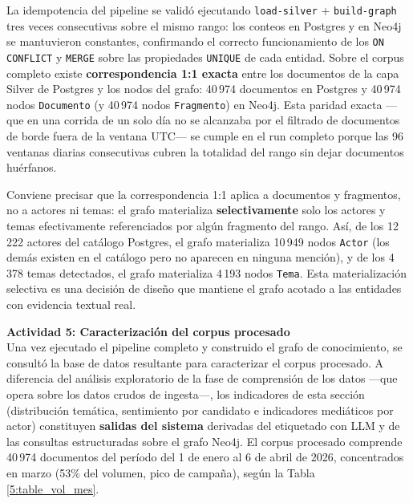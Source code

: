 La idempotencia del pipeline se validó ejecutando \texttt{load-silver} +
\texttt{build-graph} tres veces consecutivas sobre el mismo rango: los conteos
en Postgres y en Neo4j se mantuvieron constantes, confirmando el correcto
funcionamiento de los \texttt{ON CONFLICT} y \texttt{MERGE} sobre las
propiedades \texttt{UNIQUE} de cada entidad. Sobre el corpus completo existe
\textbf{correspondencia 1:1 exacta} entre los documentos de la capa Silver de
Postgres y los nodos del grafo: 40\,974 documentos en Postgres y 40\,974 nodos
\texttt{Documento} (y 40\,974 nodos \texttt{Fragmento}) en Neo4j. Esta paridad
exacta —que en una corrida de un solo día no se alcanzaba por el filtrado de
documentos de borde fuera de la ventana UTC— se cumple en el run completo porque
las 96 ventanas diarias consecutivas cubren la totalidad del rango sin dejar
documentos huérfanos.

Conviene precisar que la correspondencia 1:1 aplica a documentos y fragmentos,
no a actores ni temas: el grafo materializa \textbf{selectivamente} solo los
actores y temas efectivamente referenciados por algún fragmento del rango. Así,
de los 12\,222 actores del catálogo Postgres, el grafo materializa 10\,949 nodos
\texttt{Actor} (los demás existen en el catálogo pero no aparecen en ninguna
mención), y de los 4\,378 temas detectados, el grafo materializa 4\,193 nodos
\texttt{Tema}. Esta materialización selectiva es una decisión de diseño que
mantiene el grafo acotado a las entidades con evidencia textual real.

\textbf{Actividad 5: Caracterización del corpus procesado}
\\
Una vez ejecutado el pipeline completo y construido el grafo de conocimiento,
se consultó la base de datos resultante para caracterizar el corpus
procesado. A diferencia del análisis exploratorio de la fase de comprensión
de los datos —que opera sobre los datos crudos de ingesta—, los indicadores
de esta sección (distribución temática, sentimiento por candidato e
indicadores mediáticos por actor) constituyen \textbf{salidas del sistema}
derivadas del etiquetado con LLM y de las consultas estructuradas sobre el
grafo Neo4j. El corpus procesado comprende 40\,974 documentos del período
del 1 de enero al 6 de abril de 2026, concentrados en marzo (53\% del
volumen, pico de campaña), según la Tabla \ref{5:table_vol_mes}.

